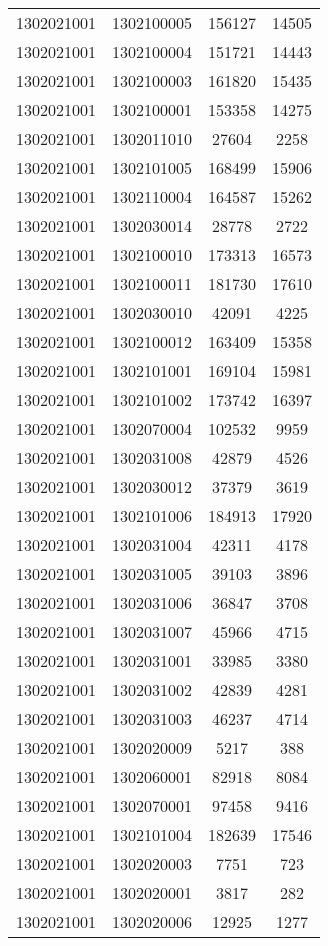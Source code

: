 \begin{longtable}[h]{llcc}
		1302021001 & 1302100005 & 156127 & 14505\\
		1302021001 & 1302100004 & 151721 & 14443\\
		1302021001 & 1302100003 & 161820 & 15435\\
		1302021001 & 1302100001 & 153358 & 14275\\
		1302021001 & 1302011010 & 27604 & 2258\\
		1302021001 & 1302101005 & 168499 & 15906\\
		1302021001 & 1302110004 & 164587 & 15262\\
		1302021001 & 1302030014 & 28778 & 2722\\
		1302021001 & 1302100010 & 173313 & 16573\\
		1302021001 & 1302100011 & 181730 & 17610\\
		1302021001 & 1302030010 & 42091 & 4225\\
		1302021001 & 1302100012 & 163409 & 15358\\
		1302021001 & 1302101001 & 169104 & 15981\\
		1302021001 & 1302101002 & 173742 & 16397\\
		1302021001 & 1302070004 & 102532 & 9959\\
		1302021001 & 1302031008 & 42879 & 4526\\
		1302021001 & 1302030012 & 37379 & 3619\\
		1302021001 & 1302101006 & 184913 & 17920\\
		1302021001 & 1302031004 & 42311 & 4178\\
		1302021001 & 1302031005 & 39103 & 3896\\
		1302021001 & 1302031006 & 36847 & 3708\\
		1302021001 & 1302031007 & 45966 & 4715\\
		1302021001 & 1302031001 & 33985 & 3380\\
		1302021001 & 1302031002 & 42839 & 4281\\
		1302021001 & 1302031003 & 46237 & 4714\\
		1302021001 & 1302020009 & 5217 & 388\\
		1302021001 & 1302060001 & 82918 & 8084\\
		1302021001 & 1302070001 & 97458 & 9416\\
		1302021001 & 1302101004 & 182639 & 17546\\
		1302021001 & 1302020003 & 7751 & 723\\
		1302021001 & 1302020001 & 3817 & 282\\
		1302021001 & 1302020006 & 12925 & 1277\\

\end{longtable}

